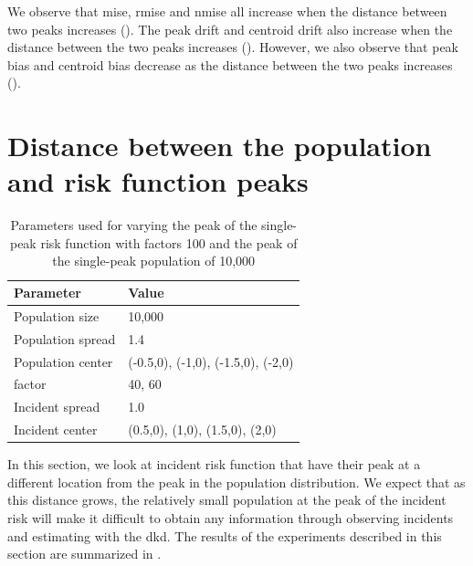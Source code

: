 We observe that \gls{mise}, \gls{rmise} and \gls{nmise} all increase when the distance between two peaks increases ().
The \gls{peak drift} and \gls{centroid drift} also increase when the distance between the two peaks increases ().
However, we also observe that \gls{peak bias} and \gls{centroid bias} decrease as the distance between the two peaks increases ().


\section{Distance between the population and risk function peaks}
\label{sec:results:p1.4_Gap_risk}

\begin{table}[htbp]
    \centering
    \begin{tabular}{ll}
        \toprule
        Parameter & Value \\
        \midrule
        Population size & 10,000 \\
        Population \gls{spread} & 1.4 \\
        Population center & (-0.5,0), (-1,0), (-1.5,0), (-2,0) \\
        \Gls{factor} & 40, 60 \\
        Incident \gls{spread} & 1.0 \\
        Incident center & (0.5,0), (1,0), (1.5,0), (2,0) \\
        \bottomrule
    \end{tabular}
    \caption{Parameters used for varying the peak of the single-peak risk function with \glspl{factor} 100 and the peak of the single-peak population of 10,000}
    \label{tab:params:p1.4_100_Gap_risk}
\end{table}

In this section, we look at incident risk function that have their peak at a different location from the peak in the population distribution.
We expect that as this distance grows, the relatively small population at the peak of the incident risk will make it difficult to obtain any information through observing incidents and estimating with the \gls{dkd}.
The results of the experiments described in this section are summarized in .


